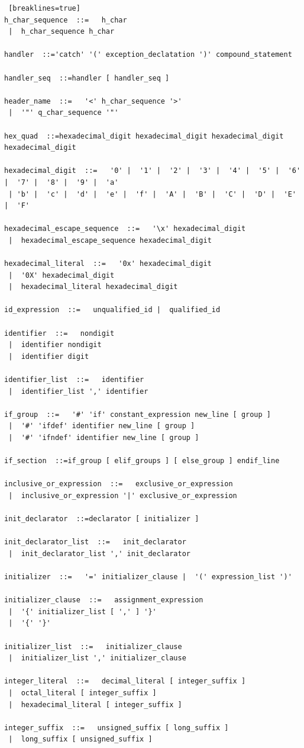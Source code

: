 \documentclass[11pt]{book}
\begin{document}
\begin{lstlisting} [breaklines=true]
h_char_sequence  ::=   h_char
 |  h_char_sequence h_char

handler  ::='catch' '(' exception_declatation ')' compound_statement

handler_seq  ::=handler [ handler_seq ]

header_name  ::=   '<' h_char_sequence '>'
 |  '"' q_char_sequence '"'

hex_quad  ::=hexadecimal_digit hexadecimal_digit hexadecimal_digit hexadecimal_digit

hexadecimal_digit  ::=   '0' |  '1' |  '2' |  '3' |  '4' |  '5' |  '6' |  '7' |  '8' |  '9' |  'a'
 | 'b' |  'c' |  'd' |  'e' |  'f' |  'A' |  'B' |  'C' |  'D' |  'E' |  'F'

hexadecimal_escape_sequence  ::=   '\x' hexadecimal_digit
 |  hexadecimal_escape_sequence hexadecimal_digit

hexadecimal_literal  ::=   '0x' hexadecimal_digit
 |  '0X' hexadecimal_digit
 |  hexadecimal_literal hexadecimal_digit

id_expression  ::=   unqualified_id |  qualified_id

identifier  ::=   nondigit
 |  identifier nondigit
 |  identifier digit

identifier_list  ::=   identifier
 |  identifier_list ',' identifier

if_group  ::=   '#' 'if' constant_expression new_line [ group ]
 |  '#' 'ifdef' identifier new_line [ group ]
 |  '#' 'ifndef' identifier new_line [ group ]

if_section  ::=if_group [ elif_groups ] [ else_group ] endif_line

inclusive_or_expression  ::=   exclusive_or_expression
 |  inclusive_or_expression '|' exclusive_or_expression

init_declarator  ::=declarator [ initializer ]

init_declarator_list  ::=   init_declarator
 |  init_declarator_list ',' init_declarator

initializer  ::=   '=' initializer_clause |  '(' expression_list ')'

initializer_clause  ::=   assignment_expression
 |  '{' initializer_list [ ',' ] '}'
 |  '{' '}'

initializer_list  ::=   initializer_clause
 |  initializer_list ',' initializer_clause

integer_literal  ::=   decimal_literal [ integer_suffix ]
 |  octal_literal [ integer_suffix ]
 |  hexadecimal_literal [ integer_suffix ]

integer_suffix  ::=   unsigned_suffix [ long_suffix ]
 |  long_suffix [ unsigned_suffix ]


\end{lstlisting}
\end{document}
